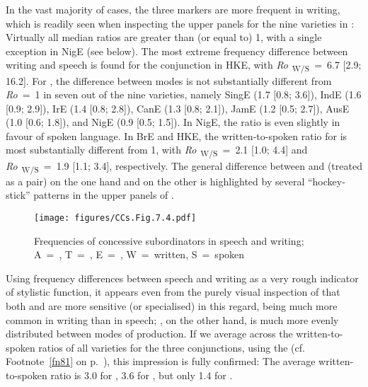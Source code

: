 In the vast majority of cases, the three markers are more frequent in writing, which is readily seen when inspecting the upper panels for the nine varieties in : Virtually all median ratios are greater than (or equal to) 1, with a single exception in NigE (see below). The most extreme frequency difference between writing and speech is found for the conjunction  in HKE, with \textit{Ro}\textsubscript{~W/S}~=~6.7 [2.9; 16.2]. For , the difference between modes is not substantially different from \textit{Ro}~=~1 in seven out of the nine varieties, namely SingE (1.7 [0.8; 3.6]), IndE (1.6 [0.9; 2.9]), IrE (1.4 [0.8; 2.8]), CanE (1.3 [0.8; 2.1]), JamE (1.2 [0.5; 2.7]), AusE (1.0 [0.6; 1.8]), and NigE (0.9 [0.5; 1.5]). In NigE, the ratio is even slightly in favour of spoken language. In BrE and HKE, the written-to-spoken ratio for  is most substantially different from 1, with \textit{Ro}\textsubscript{~W/S}~=~2.1 [1.0; 4.4] and \textit{Ro}\textsubscript{~W/S}~=~1.9 [1.1; 3.4], respectively. The general difference between  and  (treated as a pair) on the one hand and  on the other is highlighted by several “hockey-stick” patterns in the upper panels of .

\begin{figure}
\texttt{[image: figures/CCs.Fig.7.4.pdf]}
\caption{\label{bkm:Ref1849948}\label{fig:7.4}Frequencies of concessive subordinators in speech and writing; A~=~, T~=~, E~=~, W~=~written, S~=~spoken}
\end{figure}

Using frequency differences between speech and writing as a very rough indicator of stylistic function, it appears even from the purely visual inspection of  that both  and  are more sensitive (or specialised) in this regard, being much more common in writing than in speech; , on the other hand, is much more evenly distributed between modes of production. If we average across the written-to-spoken ratios of all varieties for the three conjunctions, using the  (cf. Footnote~\ref{fn81} on p.~\pageref{fn81}), this impression is fully confirmed: The average written-to-spoken ratio is 3.0 for , 3.6 for , but only 1.4 for .

